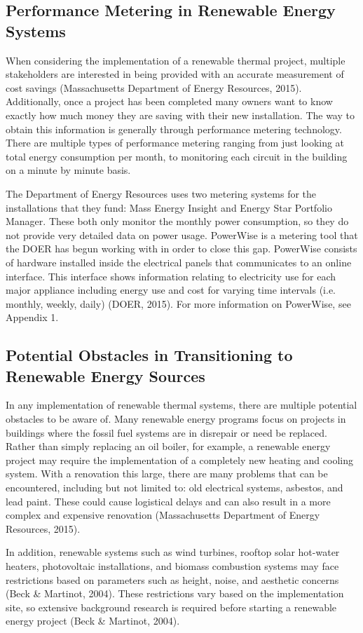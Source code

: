     \subsection{Performance Metering in Renewable Energy Systems}
    \par When considering the implementation of a renewable thermal project, multiple stakeholders are interested in being provided with an accurate measurement of cost savings (Massachusetts Department of Energy Resources, 2015). Additionally, once a project has been completed many owners want to know exactly how much money they are saving with their new installation. The way to obtain this information is generally through performance metering technology. There are multiple types of performance metering ranging from just looking at total energy consumption per month, to monitoring each circuit in the building on a minute by minute basis.
    \par The Department of Energy Resources uses two metering systems for the installations that they fund: Mass Energy Insight and Energy Star Portfolio Manager. These both only monitor the monthly power consumption, so they do not provide very detailed data on power usage. PowerWise is a metering tool that the DOER has begun working with in order to close this gap. PowerWise consists of hardware installed inside the electrical panels that communicates to an online interface. This interface shows information relating to electricity use for each major appliance including energy use and cost for varying time intervals (i.e. monthly, weekly, daily) (DOER, 2015). For more information on PowerWise, see Appendix 1.

    \subsection{Potential Obstacles in Transitioning to Renewable Energy Sources}
    \par In any implementation of renewable thermal systems, there are multiple potential obstacles to be aware of. Many renewable energy programs focus on projects in buildings where the fossil fuel systems are in disrepair or need be replaced. Rather than simply replacing an oil boiler, for example, a renewable energy project may require the implementation of a completely new heating and cooling system. With a renovation this large, there are many problems that can be encountered, including but not limited to: old electrical systems, asbestos, and lead paint. These could cause logistical delays and can also result in a more complex and expensive renovation (Massachusetts Department of Energy Resources, 2015).
    \par In addition, renewable systems such as wind turbines, rooftop solar hot-water heaters, photovoltaic installations, and biomass combustion systems may face restrictions based on parameters such as height, noise, and aesthetic concerns (Beck \& Martinot, 2004). These restrictions vary based on the implementation site, so extensive background research is required before starting a renewable energy project (Beck \& Martinot, 2004).

